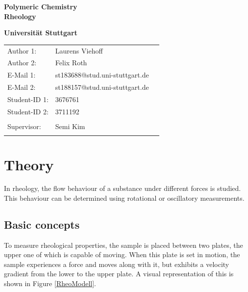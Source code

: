 \documentclass[10pt,a4paper,ngerman]{scrartcl}
\begin{document}
\begin{titlepage}
	\vspace*{2,5cm}
	\begin{center}
		\begin{LARGE}
			\textbf{Polymeric Chemistry}\\
			\textbf{Rheology}\\
		\end{LARGE}
		\vspace{1cm}
		\textbf{Universität Stuttgart}\\
		\vspace*{1,5cm}
		\begin{tabular}{lp{}l}
			Author 1:     & Laurens Viehoff\\
            Author 2:     & Felix Roth\\   
			E-Mail 1:     & st183688@stud.uni-stuttgart.de\\
            E-Mail 2:     & st188157@stud.uni-stuttgart.de  \\
			Student-ID 1: & 3676761   \\ 
            Student-ID 2: & 3711192 \\ \\
			Supervisor:    & Semi Kim   \\ \\ 
		\end{tabular}
	\end{center}
    
\end{titlepage}
\thispagestyle{empty}
\renewcommand{\thepage}{\arabic{page}}
\newpage
\tableofcontents
\setcounter{page}{1}
\renewcommand{\thepage}{\arabic{page}}
\newpage

\section{Theory}
		In rheology, the flow behaviour of a substance under different forces is studied. This behaviour can be determined using rotational or oscillatory measurements.
	
	\subsection{Basic concepts}
		To measure rheological properties, the sample is placed between two plates, the upper one of which is capable of moving. When this plate is set in motion, the 
		sample experiences a force and moves along with it, but exhibits a velocity gradient from the lower to the upper plate. A visual representation of this is shown 
		in Figure \ref{RheoModell}.
\end{document}
